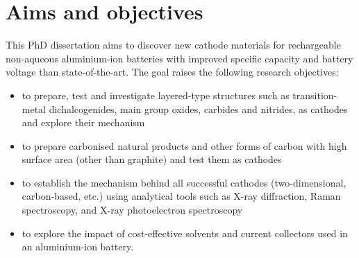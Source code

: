 \section*{\centering Aims and objectives}
This PhD dissertation aims to discover new cathode materials for rechargeable non-aqueous aluminium-ion batteries with improved specific capacity and battery voltage than state-of-the-art. The goal raises the following research objectives:
\begin{itemize}
    \item to prepare, test and investigate layered-type structures such as transition-metal dichalcogenides, main group oxides, carbides and nitrides, as cathodes and explore their mechanism
    \item to prepare carbonised natural products and other forms of carbon with high surface area (other than graphite) and test them as cathodes 
    \item to establish the mechanism behind all successful cathodes (two-dimensional, carbon-based, etc.) using analytical tools such as X-ray diffraction, Raman spectroscopy, and X-ray photoelectron spectroscopy
    \item to explore the impact of cost-effective solvents and current collectors used in an aluminium-ion battery. 
\end{itemize}

\newpage
